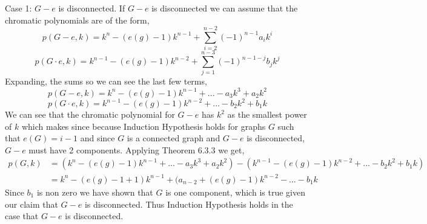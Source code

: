 \documentclass{amsart}
\begin{document}
\begin{enumerate}
Case 1: $G-e$ is disconnected. If $G-e$ is disconnected we can assume that the chromatic polynomials are of the form,
\begin{equation*}
p(G-e,k) = k^n - (e(g) - 1)k^{n-1}+\sum_{i  = 2}^{n-2}(-1)^{n-1}a_ik^i
\end{equation*}
\begin{equation*}
p(G \cdot e,k) = k^{n-1} - (e(g) - 1)k^{n-2}+\sum_{j  = 1}^{n-3}(-1)^{n-1-j}b_jk^j
\end{equation*}
Expanding, the sums so we can see the last few terms,
\begin{equation*}
p(G-e,k) = k^n - (e(g) - 1)k^{n-1}+...-a_3k^3+a_2k^2
\end{equation*}
\begin{equation*}
p(G \cdot e,k) = k^{n-1} - (e(g) - 1)k^{n-2}+...-b_2k^2+b_1k
\end{equation*}
We can see that the chromatic polynomial for $G-e$ has $k^2$ as the smallest power of $k$ which makes since because Induction Hypothesis holds for graphs $G$ such that $e(G) = i-1$ and since $G$ is a connected graph and $G-e$ is disconnected, $G-e$ must have 2 components.  Applying Theorem 6.3.3 we get, 
\begin{align*}
p(G,k) &= (k^n - (e(g) - 1)k^{n-1}+...-a_3k^3+a_2k^2) - ( k^{n-1} - (e(g) - 1)k^{n-2}+...-b_2k^2+b_1k)\\
&= k^n-(e(g)-1+1)k^{n-1}+(a_{n-2} +(e(g)-1)k^{n-2} - ... -b_1k
\end{align*}Since $b_1$ is non zero we have shown that $G$ is one component, which is true given our claim that $G-e$ is disconnected.
Thus Induction Hypothesis holds in the case that $G-e$ is disconnected. \\\\


\end{enumerate}
\end{document}
